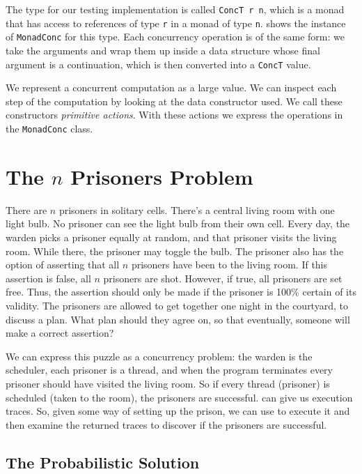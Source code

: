 The type for our testing implementation is called \verb|ConcT r n|,
which is a monad that has access to references of type \verb|r| in a
monad of type \verb|n|.   shows the instance of
\verb|MonadConc| for this type.  Each concurrency operation is of the
same form: we take the arguments and wrap them up inside a data
structure whose final argument is a continuation, which is then
converted into a \verb|ConcT| value.

We represent a concurrent computation as a large value.  We can
inspect each step of the computation by looking at the data
constructor used.  We call these constructors \emph{primitive
  actions}.  With these actions we express the operations in the
\verb|MonadConc| class.

\section{The $n$ Prisoners Problem}
\label{sec:dejafu-100}

\begin{displayquote}
  There are $n$ prisoners in solitary cells.  There's a central living
  room with one light bulb.  No prisoner can see the light bulb from
  their own cell.  Every day, the warden picks a prisoner equally at
  random, and that prisoner visits the living room.  While there, the
  prisoner may toggle the bulb.  The prisoner also has the option of
  asserting that all $n$ prisoners have been to the living room.  If
  this assertion is false, all $n$ prisoners are shot.  However, if
  true, all prisoners are set free.  Thus, the assertion should only
  be made if the prisoner is 100\% certain of its validity.  The
  prisoners are allowed to get together one night in the courtyard, to
  discuss a plan.  What plan should they agree on, so that eventually,
  someone will make a correct assertion?
\end{displayquote}

We can express this puzzle as a concurrency problem: the warden is the
scheduler, each prisoner is a thread, and when the program terminates
every prisoner should have visited the living room.  So if every
thread (prisoner) is scheduled (taken to the room), the prisoners are
successful.  \dejafu{} can give us execution traces.  So, given some
way of setting up the prison, we can use \dejafu{} to execute it and
then examine the returned traces to discover if the prisoners are
successful.

\subsection{The Probabilistic Solution}

